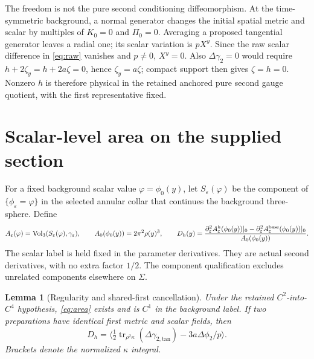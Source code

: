 \documentclass[11pt]{article}
\newcommand{\eps}{\varepsilon}
\newcommand{\av}[1]{\langle #1\rangle}
\newtheorem{lemma}{Lemma}
\begin{document}
The freedom is not the pure second conditioning diffeomorphism. At the
time-symmetric background, a normal generator changes the initial spatial
metric and scalar by multiples of $K_0=0$ and $\Pi_0=0$. Averaging a proposed
tangential generator leaves a radial one; its scalar variation is $pX^y$.
Since the raw scalar difference in \eqref{eq:raw} vanishes and $p\ne0$,
$X^y=0$. Also $\Delta\gamma_2=0$ would require
$h+2\zeta_y=h+2a\zeta=0$, hence $\zeta_y=a\zeta$; compact support then
gives $\zeta=h=0$. Nonzero $h$ is therefore physical in the retained
anchored pure second gauge quotient, with the first representative fixed.

\section{Scalar-level area on the supplied section}

For a fixed background scalar value $\varphi=\phi_0(y)$, let
$S_\eps(\varphi)$ be the component of $\{\phi_\eps=\varphi\}$ in the
selected annular collar that continues the background three-sphere. Define
\begin{equation}
 A_\eps(\varphi)=\operatorname{Vol}_3(S_\eps(\varphi),\gamma_\eps),
 \qquad A_0(\phi_0(y))=2\pi^2\rho(y)^3,
 \qquad
 D_h(y)=\frac{\partial_\eps^2 A_\eps^h(\phi_0(y))|_0
                 -\partial_\eps^2 A_\eps^{\rm base}(\phi_0(y))|_0}
                {A_0(\phi_0(y))}.
 \label{eq:area}
\end{equation}
The scalar label is held fixed in the parameter derivatives. They are
actual second derivatives, with no extra factor $1/2$. The component
qualification excludes unrelated components elsewhere on $\Sigma$.

\begin{lemma}[Regularity and shared-first cancellation]\label{lem:area}
Under the retained $C^2$-into-$C^4$ hypothesis, \eqref{eq:area} exists
and is $C^1$ in the background label. If two preparations have identical
first metric and scalar fields, then
\begin{equation}
 D_h=\av{\tfrac12\operatorname{tr}_{\rho^2\kappa}
                  (\Delta\gamma_{2,\mathrm{tan}})
                    -3a\Delta\phi_2/p}.
 \label{eq:difference}
\end{equation}
Brackets denote the normalized $\kappa$ integral.
\end{lemma}
\end{document}
